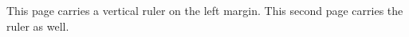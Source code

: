 \documentclass{article}
\begin{document}
\setvruler[][][][][][\textwidth]
This page carries a vertical ruler on the left margin.
\newpage
This second page carries the ruler as well.
\unsetvruler
\end{document}
